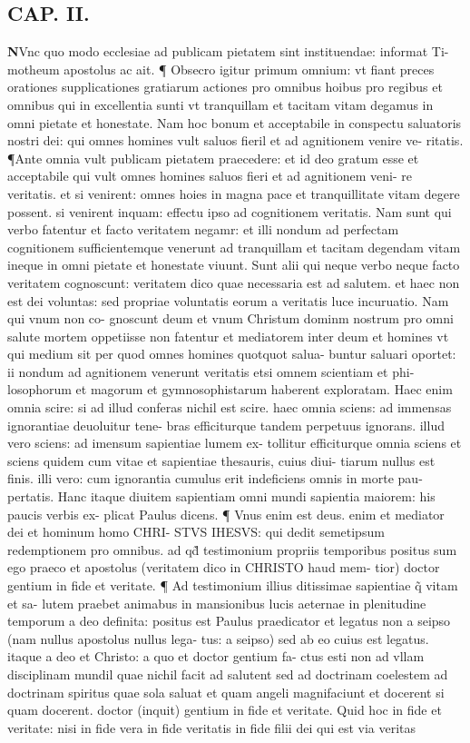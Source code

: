 \documentclass{article}
\begin{document}
\begin{pages}
\endnumbering\beginnumbering\section{CAP. II.}\pstart \huge\textbf{N}\normalsize Vnc quo modo ecclesiae ad publicam pietatem sint instituendae: informat Ti- motheum apostolus ac ait. ¶ Obsecro igitur primum omnium: vt fiant preces orationes supplicationes gratiarum actiones pro omnibus hoibus pro regibus et omnibus qui in excellentia sunti vt tranquillam et tacitam vitam degamus in omni pietate et honestate. Nam hoc bonum et acceptabile in conspectu saluatoris nostri dei: qui omnes homines vult saluos fieril et ad agnitionem venire ve- ritatis. ¶Ante omnia vult publicam pietatem praecedere: et id deo gratum esse et acceptabile qui vult omnes homines saluos fieri et ad agnitionem veni- re veritatis. et si venirent: omnes hoies in magna pace et tranquillitate vitam degere possent. si venirent inquam: effectu ipso ad cognitionem veritatis. Nam sunt qui verbo fatentur et facto veritatem negamr: et illi nondum ad perfectam cognitionem sufficientemque venerunt ad tranquillam et tacitam degendam vitam ineque in omni pietate et honestate viuunt. Sunt alii qui neque verbo neque facto veritatem cognoscunt: veritatem dico quae necessaria est ad salutem. et haec non est dei voluntas: sed propriae voluntatis eorum a veritatis luce incuruatio. Nam qui vnum non co- gnoscunt deum et vnum Christum dominm nostrum pro omni salute mortem oppetiisse non fatentur et mediatorem inter deum et homines vt qui medium sit per quod omnes homines quotquot salua- buntur saluari oportet: ii nondum ad agnitionem venerunt veritatis etsi omnem scientiam et phi- losophorum et magorum et gymnosophistarum haberent exploratam. Haec enim omnia scire: si ad illud conferas nichil est scire. haec omnia sciens: ad immensas ignorantiae deuoluitur tene- bras efficiturque tandem perpetuus ignorans. illud vero sciens: ad imensum sapientiae lumem ex- tollitur efficiturque omnia sciens et sciens quidem cum vitae et sapientiae thesauris, cuius diui- tiarum nullus est finis. illi vero: cum ignorantia cumulus erit indeficiens omnis in morte pau- pertatis. Hanc itaque diuitem sapientiam omni mundi sapientia maiorem: his paucis verbis ex- plicat Paulus dicens. ¶ Vnus enim est deus. enim et mediator dei et hominum homo CHRI- STVS IHESVS: qui dedit semetipsum redemptionem pro omnibus. ad qd̃ testimonium propriis  temporibus positus sum ego praeco et apostolus (veritatem dico in CHRISTO haud mem-  tior) doctor gentium in fide et veritate. ¶ Ad testimonium illius ditissimae sapientiae q̃ vitam et sa- lutem praebet animabus in mansionibus lucis aeternae in plenitudine temporum a deo definita: positus est Paulus praedicator et legatus non a seipso (nam nullus apostolus nullus lega- tus: a seipso) sed ab eo cuius est legatus. itaque a deo et Christo: a quo et doctor gentium fa- ctus esti non ad vllam disciplinam mundil quae nichil facit ad salutent sed ad doctrinam coelestem  ad doctrinam spiritus quae sola saluat et quam angeli magnifaciunt et docerent si quam docerent. doctor (inquit) gentium in fide et veritate. Quid hoc in fide et veritate: nisi in fide vera in fide veritatis in fide filii dei qui est via veritas 
\end{pages}
\end{document}
